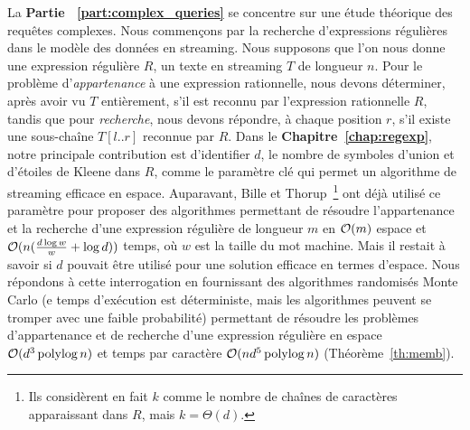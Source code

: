 La \textbf{Partie ~\ref{part:complex_queries}} se concentre sur une étude théorique des requêtes complexes.
Nous commençons par la recherche d'expressions régulières dans le modèle des données en streaming.
%
Nous supposons que l'on nous donne une expression régulière $R$, un texte en streaming $T$ de longueur $n$. Pour le problème d'\emph{appartenance} à une expression rationnelle, nous devons déterminer, après avoir vu $T$ entièrement, s'il est reconnu par l'expression rationnelle $R$, tandis que pour \emph{recherche}, nous devons répondre, à chaque position $r$, s'il existe une sous-chaîne $T[l..r]$ reconnue par $R$.
Dans le \textbf{Chapitre~\ref{chap:regexp}}, notre principale contribution est d'identifier $d$, le nombre de symboles d'union et d'étoiles de Kleene dans $R$, comme le paramètre clé qui permet un algorithme de streaming efficace en espace. 
Auparavant, Bille et Thorup~\cite{doi:10.1137/1.9781611973075.104}\footnote{Ils considèrent en fait $k$ comme le nombre de chaînes de caractères apparaissant dans $R$, mais $k=\Theta(d)$. } ont déjà utilisé ce paramètre pour proposer des algorithmes permettant de résoudre l'appartenance et la recherche d'une expression régulière de longueur $m$ en $\mathcal{O}(m)$ espace et $\mathcal{O}(n(\frac{d\log w}{w} + \log d))$ temps, où $w$ est la taille du mot machine. Mais il restait à savoir si $d$ pouvait être utilisé pour une solution efficace en termes d'espace.
%
Nous répondons à cette interrogation en fournissant des algorithmes randomisés Monte Carlo (e temps d'exécution est déterministe, mais les algorithmes peuvent se tromper avec une faible probabilité) permettant de résoudre les problèmes d'appartenance et de recherche d'une expression régulière en espace $\mathcal{O}(d^3\operatorname{polylog} n)$  et temps par caractère  $\mathcal{O}(nd^5\operatorname{polylog} n)$  (Théorème~\ref{th:memb}).

